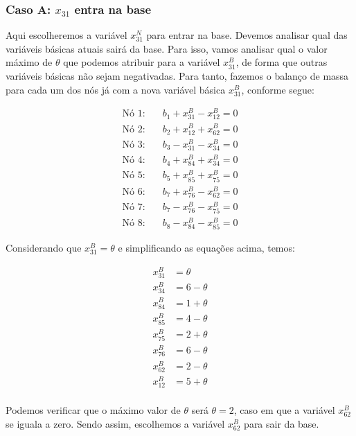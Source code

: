 \documentclass{article}
\begin{document}
\subsubsection{Caso A: $x_{31}$ entra na base}

Aqui escolheremos a variável $x^{N}_{31}$ para entrar na base.
Devemos analisar qual das variáveis básicas atuais sairá da base.
Para isso, vamos analisar qual o valor máximo de $\theta$ que podemos atribuir para a variável $x^{B}_{31}$, de forma que outras variáveis básicas não sejam negativadas.
Para tanto, fazemos o balanço de massa para cada um dos nós já com a nova variável básica $x^{B}_{31}$, conforme segue:

\begin{align}
    \text{Nó 1:} & \quad b_{1} + x^{B}_{31} - x^{B}_{12} = 0 \\
    \text{Nó 2:} & \quad b_{2} + x^{B}_{12} + x^{B}_{62} = 0 \\
    \text{Nó 3:} & \quad b_{3} - x^{B}_{31} - x^{B}_{34} = 0 \\
    \text{Nó 4:} & \quad b_{4} + x^{B}_{84} + x^{B}_{34} = 0 \\
    \text{Nó 5:} & \quad b_{5} + x^{B}_{85} + x^{B}_{75} = 0 \\
    \text{Nó 6:} & \quad b_{7} + x^{B}_{76} - x^{B}_{62} = 0 \\
    \text{Nó 7:} & \quad b_{7} - x^{B}_{76} - x^{B}_{75} = 0 \\
    \text{Nó 8:} & \quad b_{8} - x^{B}_{84} - x^{B}_{85} = 0
\end{align}


Considerando que $x^{B}_{31} = \theta$ e simplificando as equações acima, temos:

\begin{align*}
    x^{B}_{31} &= \theta \\
    x^{B}_{34} &= 6 - \theta \\
    x^{B}_{84} &= 1 + \theta \\
    x^{B}_{85} &= 4 - \theta \\
    x^{B}_{75} &= 2 + \theta \\
    x^{B}_{76} &= 6 - \theta \\
    x^{B}_{62} &= 2 - \theta \\
    x^{B}_{12} &= 5 + \theta \\
\end{align*}

Podemos verificar que o máximo valor de $\theta$ será $\theta=2$, caso em que a variável $x^{B}_{62}$ se iguala a zero.
Sendo assim, escolhemos a variável $x^{B}_{62}$ para sair da base.
\end{document}

